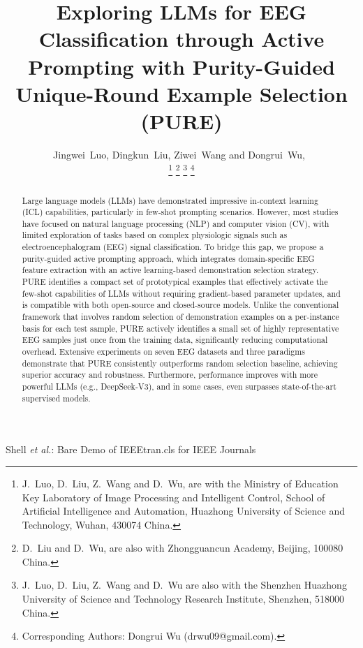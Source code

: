 \documentclass[journal,twocolumn]{IEEEtran}
\begin{document}
\title{Exploring LLMs for EEG Classification through Active Prompting with Purity-Guided Unique-Round Example Selection (PURE)}

\author{Jingwei~Luo, Dingkun~Liu, Ziwei~Wang and Dongrui~Wu,~

\thanks{J.~Luo, D.~Liu, Z.~Wang and D.~Wu, are with the Ministry of Education Key Laboratory of Image Processing and Intelligent Control, School of Artificial Intelligence and Automation, Huazhong University of Science and Technology, Wuhan, 430074 China.}
\thanks{D.~Liu and D.~Wu, are also with Zhongguancun Academy, Beijing, 100080 China.}
\thanks{J.~Luo, D.~Liu, Z.~Wang and D.~Wu are also with the Shenzhen Huazhong University of Science and Technology Research Institute, Shenzhen, 518000 China.}
\thanks{Corresponding Authors: Dongrui Wu (drwu09@gmail.com).}
}
\markboth{}%
{Shell \MakeLowercase{\textit{et al.}}: Bare Demo of IEEEtran.cls for IEEE Journals}
\maketitle

\begin{abstract}
  Large language models (LLMs) have demonstrated impressive in-context learning (ICL) capabilities, particularly in few-shot prompting scenarios. However, most studies have focused on natural language processing (NLP) and computer vision (CV), with limited exploration of tasks based on complex physiologic signals such as electroencephalogram (EEG) signal classification.
  To bridge this gap, we propose a purity-guided active prompting approach, which integrates domain-specific EEG feature extraction with an active learning-based demonstration selection strategy. PURE identifies a compact set of prototypical examples that effectively activate the few-shot capabilities of LLMs without requiring gradient-based parameter updates, and is compatible with both open-source and closed-source models.
  Unlike the conventional framework that involves random selection of demonstration examples on a per-instance basis for each test sample, PURE actively identifies a small set of highly representative EEG samples just once from the training data, significantly reducing computational overhead.
  Extensive experiments on seven EEG datasets and three paradigms demonstrate that PURE consistently outperforms random selection baseline, achieving superior accuracy and robustness. Furthermore, performance improves with more powerful LLMs (e.g., DeepSeek-V3), and in some cases, even surpasses state-of-the-art supervised models.
\end{abstract}
\end{document}
